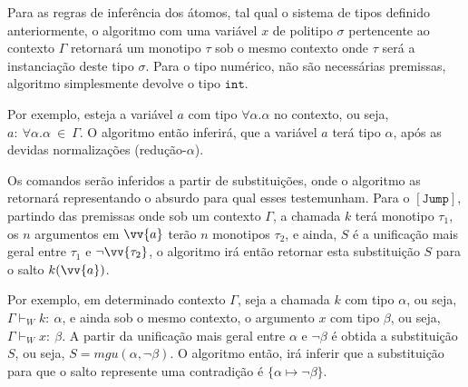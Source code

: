 \begin{prooftree}
\end{prooftree}
Para as regras de inferência dos átomos, tal qual o sistema de tipos definido anteriormente, o algoritmo com uma variável $x$ de politipo $\sigma$ pertencente ao contexto $\Gamma$ retornará um monotipo $\tau$ sob o mesmo contexto onde $\tau$ será a instanciação deste tipo $\sigma$.
Para o tipo numérico, não são necessárias premissas, algoritmo simplesmente devolve o tipo $\mathtt{int}$.
\begin{prooftree}
\end{prooftree}
Por exemplo, esteja a variável $a$ com tipo $\forall\alpha.\alpha$ no contexto, ou seja, $a{:}\ \forall\alpha.\alpha\ \in\ \Gamma$.
O algoritmo então inferirá, que a variável $a$ terá tipo $\alpha$, após as devidas normalizações (redução-$\alpha$).

Os comandos serão inferidos a partir de substituições, onde o algoritmo as retornará representando o absurdo para qual esses testemunham.
Para o $\mathtt{[Jump]}$, partindo das premissas onde sob um contexto $\Gamma$, a chamada $k$ terá monotipo $\tau_1$, os $n$ argumentos em $\vv{a}$ terão $n$ monotipos $\tau_2$, e ainda, $S$ é a unificação mais geral entre $\tau_1$ e $\neg\vv{\tau_2}$, o algoritmo irá então retornar esta substituição $S$ para o salto $k(\vv{a})$.

\begin{prooftree}
\end{prooftree}
Por exemplo, em determinado contexto $\Gamma$, seja a chamada $k$ com tipo $\alpha$, ou seja, $\Gamma \vdash_W k{:}\ \alpha$, e ainda sob o mesmo contexto, o argumento $x$ com tipo $\beta$, ou seja, $\Gamma \vdash_W x{:}\ \beta$.
A partir da unificação mais geral entre $\alpha$ e $\neg\beta$ é obtida a substituição $S$, ou seja, $S = \mathit{mgu}(\alpha, \neg\beta)$.
O algoritmo então, irá inferir que a substituição para que o salto represente uma contradição é $\{\alpha \mapsto \neg\beta\}$.

